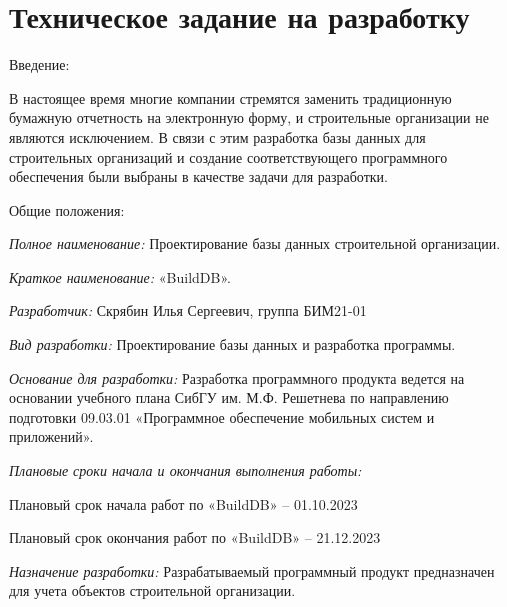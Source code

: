 \documentclass{../SIBGU-state}
\begin{document}
\appendix

\section{Техническое задание на разработку}

Введение: \par
В настоящее время многие компании стремятся заменить традиционную бумажную отчетность на электронную форму, и строительные организации не являются исключением. В связи с этим разработка базы данных для строительных организаций и создание соответствующего программного обеспечения были выбраны в качестве задачи для разработки. \par\bigskip

Общие положения: \par
\textit{Полное наименование:} Проектирование базы данных строительной организации.\par
\textit{Краткое наименование:} «BuildDB».\par
\textit{Разработчик:} Скрябин Илья Сергеевич, группа БИМ21-01\par
\textit{Вид разработки:} Проектирование базы данных и разработка программы.\par
\textit{Основание для разработки:} Разработка программного продукта ведется на основании учебного плана СибГУ им. М.Ф. Решетнева по направлению подготовки 09.03.01 «Программное обеспечение мобильных систем и приложений».\par
\textit{Плановые сроки начала и окончания выполнения работы:} \par
Плановый срок начала работ по «BuildDB» – 01.10.2023 \par
Плановый срок окончания работ по «BuildDB» – 21.12.2023\par
\textit{Назначение	разработки:}	Разрабатываемый	программный	продукт предназначен для учета объектов строительной организации.\par\bigskip
\end{document}

